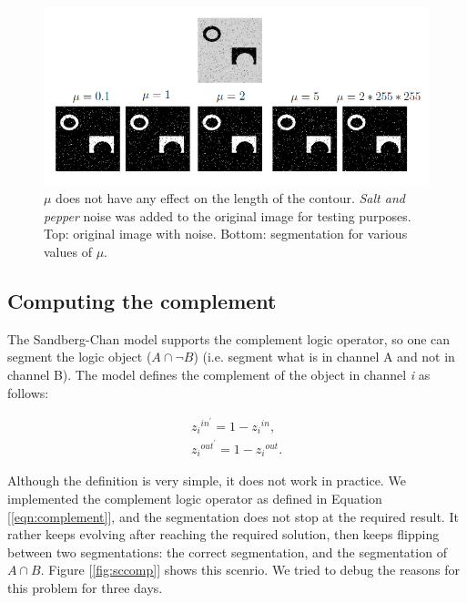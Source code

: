 \documentclass[10pt,twocolumn,letterpaper]{article}
\begin{document}
\begin{figure}[t]
\centering
\includegraphics[width=\textwidth]{cvmu.png}
\caption{$\mu$ does not have any effect on the length of the contour. \textit{Salt and pepper} noise was added to the original image for testing
purposes. Top: original image with noise. Bottom: segmentation for various values of $\mu$.}
\label{fig:cvmu}
\end{figure}

\subsection{Computing the complement}
The Sandberg-Chan model supports the complement logic operator, so one can segment the logic object ($A \cap \neg B$) (i.e. segment what is in channel A and not
in channel B). The model defines the complement of the object in channel \textit{i} as follows:

\begin{equation}
\label{eqn:complement}
\begin{align*}
{z_{i}}^{in^{'}} = 1 - {z_{i}}^{in}, \\
{z_{i}}^{out^{'}} = 1 - {z_{i}}^{out}.
\end{align*}
\end{equation}

Although the definition is very simple, it does not work in practice. We implemented the complement logic operator as defined in Equation
[\ref{eqn:complement}], and the segmentation does not stop at the required result. It rather keeps evolving after reaching the required solution, then keeps
flipping between two segmentations: the correct segmentation, and the segmentation of $A \cap B$. Figure [\ref{fig:sccomp}] shows this scenrio. We tried to
debug the reasons for this problem for three days.
\end{document}
